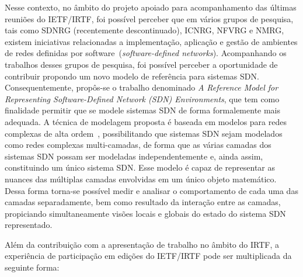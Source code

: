 \documentclass[12pt]{article}
\begin{document}
Nesse contexto, no âmbito do projeto apoiado para acompanhamento das últimas reuniões do IETF/IRTF, foi possível perceber que em vários grupos de pesquisa, tais como SDNRG (recentemente descontinuado), ICNRG, NFVRG e NMRG, existem iniciativas relacionadas a implementação, aplicação e gestão de ambientes de redes definidas por software~(\textit{software-defined networks}). Acompanhando os trabalhos desses grupos de pesquisa, foi possível perceber a oportunidade de contribuir propondo um novo modelo de referência para sistemas SDN. Consequentemente, propôs-se o trabalho denominado \textit{A Reference Model for Representing Software-Defined Network (SDN) Environments}, que tem como finalidade permitir que se modele sistemas SDN de forma formalemente mais adequada. A técnica de modelagem proposta é baseada em modelos para redes complexas de alta ordem~\cite{Wehmuth2016, Wehmuth2016a}, possibilitando que sistemas SDN sejam modelados como redes complexas multi-camadas, de forma que as várias camadas dos sistemas SDN possam ser modeladas independentemente e, ainda assim, constituindo um único sistema SDN. Esse modelo é capaz de representar as nuances das múltiplas camadas envolvidas em um único objeto matemático. Dessa forma torna-se possível medir e analisar o comportamento de cada uma das camadas separadamente, bem como resultado da interação entre as camadas, propiciando simultaneamente visões locais e globais do estado do sistema SDN representado.

Além da contribuição com a  apresentação de trabalho no âmbito do IRTF, a experiência de participação em edições do IETF/IRTF pode ser multiplicada da seguinte forma:
\end{document}
